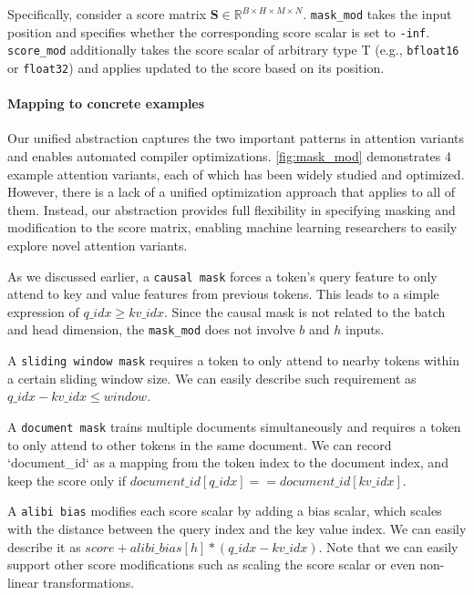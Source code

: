 Specifically, consider a score matrix $\mathbf{S} \in \mathbb{R}^{B\times H\times M \times N}$. 
\texttt{mask\_mod} takes the input position and specifies whether the corresponding score scalar is set to {\tt -inf}.
\texttt{score\_mod} additionally takes the score scalar of arbitrary type T (e.g., \texttt{bfloat16} or \texttt{float32}) and applies updated to the score based on its position.


\paragraph{Mapping to concrete examples}
Our unified abstraction captures the two important patterns in attention variants and enables automated compiler optimizations.
\autoref{fig:mask_mod} demonstrates 4 example attention variants, 
each of which has been widely studied and optimized. However, there is a lack of a unified optimization approach that applies to all of them. 
Instead, our abstraction provides full flexibility in specifying masking and modification to the score matrix, enabling machine learning researchers to easily explore novel attention variants. 

As we discussed earlier, a \texttt{causal mask} forces a token's query feature to only attend to key and value features from previous tokens. This leads to a simple expression of $q\_idx \ge kv\_idx$. Since the causal mask is not related to the batch and head dimension, the \texttt{mask\_mod} does not involve $b$ and $h$ inputs.

A \texttt{sliding window mask} requires a token to only attend to nearby tokens within a certain sliding window size. We can easily describe such requirement as $q\_idx - kv\_idx \le window$.

A \texttt{document mask} trains multiple documents simultaneously and requires a token to only attend to other tokens in the same document. We can record `document\_id` as a mapping from the token index to the document index, and keep the score only if $document\_id[q\_idx] == document\_id[kv\_idx]$.

A \texttt{alibi bias} modifies each score scalar by adding a bias scalar, which scales with the distance between the query index and the key value index. We can easily describe it as $score + alibi\_bias[h] * (q\_idx - kv\_idx)$. Note that we can easily support other score modifications such as scaling the score scalar or even non-linear transformations.



















